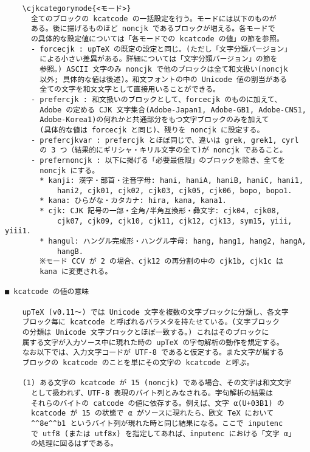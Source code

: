 \documentclass[uplatex,dvipdfmx,a4paper]{jsarticle}
\begin{document}
\begin{verbatim}
    \cjkcategorymode{<モード>}
      全てのブロックの kcatcode の一括設定を行う。モードには以下のものが
      ある。後に揚げるものほど noncjk であるブロックが増える。各モードで
      の具体的な設定値については「各モードでの kcatcode の値」の節を参照。
      - forcecjk : upTeX の既定の設定と同じ。(ただし「文字分類バージョン」
        による小さい差異がある。詳細については「文字分類バージョン」の節を
        参照。) ASCII 文字のみ noncjk で他のブロックは全て和文扱い(noncjk
        以外; 具体的な値は後述)。和文フォントの中の Unicode 値の割当がある
        全ての文字を和文文字として直接用いることができる。
      - prefercjk : 和文扱いのブロックとして、forcecjk のものに加えて、
        Adobe の定める CJK 文字集合(Adobe-Japan1, Adobe-GB1, Adobe-CNS1,
        Adobe-Korea1)の何れかと共通部分をもつ文字ブロックのみを加えて
        (具体的な値は forcecjk と同じ)、残りを noncjk に設定する。
      - prefercjkvar : prefercjk とほぼ同じで、違いは grek, grek1, cyrl
        の 3 つ（結果的にギリシャ・キリル文字の全て)が noncjk であること。
      - prefernoncjk : 以下に掲げる「必要最低限」のブロックを除き、全てを
        noncjk にする。
        * kanji: 漢字・部首・注音字母: hani, haniA, haniB, haniC, hani1,
            hani2, cjk01, cjk02, cjk03, cjk05, cjk06, bopo, bopo1.
        * kana: ひらがな・カタカナ: hira, kana, kana1.
        * cjk: CJK 記号の一部・全角/半角互換形・彝文字: cjk04, cjk08, 
            cjk07, cjk09, cjk10, cjk11, cjk12, cjk13, sym15, yiii, yiii1.
        * hangul: ハングル完成形・ハングル字母: hang, hang1, hang2, hangA,
            hangB.
        ※モード CCV が 2 の場合、cjk12 の再分割の中の cjk1b, cjk1c は
        kana に変更される。

■ kcatcode の値の意味

    upTeX (v0.11～) では Unicode 文字を複数の文字ブロックに分類し、各文字
    ブロック毎に kcatcode と呼ばれるパラメタを持たせている。(文字ブロック
    の分類は Unicode 文字ブロックとほぼ一致する。) これはそのブロックに
    属する文字が入力ソース中に現れた時の upTeX の字句解析の動作を規定する。
    なお以下では、入力文字コードが UTF-8 であると仮定する。また文字が属する
    ブロックの kcatcode のことを単にその文字の kcatcode と呼ぶ。

    (1) ある文字の kcatcode が 15 (noncjk) である場合、その文字は和文文字
      として扱われず、UTF-8 表現のバイト列とみなされる。字句解析の結果は
      それらのバイトの catcode の値に依存する。例えば、文字 α(U+03B1) の
      kcatcode が 15 の状態で α がソースに現れたら、欧文 TeX において
      ^^8e^^b1 というバイト列が現れた時と同じ結果になる。ここで inputenc
      で utf8 (または utf8x) を指定してあれば、inputenc における「文字 α」
      の処理に回るはずである。


\end{verbatim}
\end{document}
